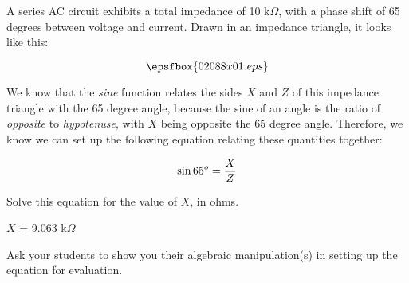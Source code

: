 

A series AC circuit exhibits a total impedance of 10 k$\Omega$, with a phase shift of 65 degrees between voltage and current.  Drawn in an impedance triangle, it looks like this:

$$\epsfbox{02088x01.eps}$$

We know that the {\it sine} function relates the sides $X$ and $Z$ of this impedance triangle with the 65 degree angle, because the sine of an angle is the ratio of {\it opposite} to {\it hypotenuse}, with $X$ being opposite the 65 degree angle.  Therefore, we know we can set up the following equation relating these quantities together:

$$\sin 65^o = {X \over Z}$$

Solve this equation for the value of $X$, in ohms.







$X$ = 9.063 k$\Omega$







Ask your students to show you their algebraic manipulation(s) in setting up the equation for evaluation.




